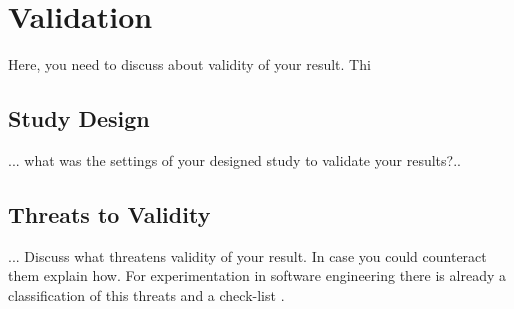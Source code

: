 
\chapter{Validation}
\label{chap:ch2}

Here, you need to discuss about validity of your result.
Thi

\section{Study Design}
... what was the settings of your designed study to validate your results?.. 

\section{Threats to Validity}
... Discuss what threatens validity of your result. In case you could counteract them explain how. For experimentation in software engineering there is already a classification of this threats and a check-list \cite{DBLP:journals/ese/RunesonH09}.   

